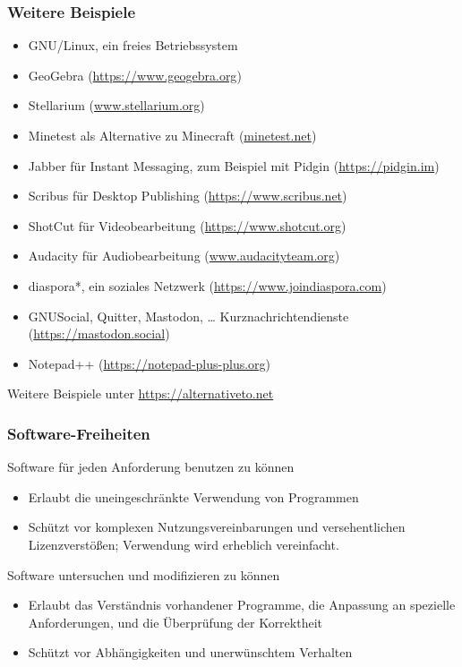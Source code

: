\documentclass{beamer}
\begin{document}
\begin{frame}
  \frametitle{Weitere Beispiele}

  \onslide<+->

  \begin{itemize}
  \item GNU/Linux, ein freies Betriebssystem %
  \item GeoGebra (\url{https://www.geogebra.org})
  \item Stellarium (\url{www.stellarium.org})
  \item Minetest als Alternative zu Minecraft (\url{minetest.net})
  \item Jabber für Instant Messaging, zum Beispiel mit Pidgin
    (\url{https://pidgin.im})
  \item Scribus für Desktop Publishing (\url{https://www.scribus.net})
  \item ShotCut für Videobearbeitung (\url{https://www.shotcut.org})
  \item Audacity für Audiobearbeitung (\url{www.audacityteam.org})
  \item diaspora*, ein soziales Netzwerk (\url{https://www.joindiaspora.com})
  \item GNUSocial, Quitter, Mastodon, \dots{} Kurznachrichtendienste
    (\url{https://mastodon.social})
  \item Notepad++ (\url{https://notepad-plus-plus.org})
  \end{itemize}

  Weitere Beispiele unter \url{https://alternativeto.net}

\end{frame}

\begin{frame}
  \frametitle{Software-Freiheiten}

  \onslide<+->
  \onslide<+->

  \begin{block}{Software für jeden Anforderung benutzen zu können}
    \begin{itemize}
    \item Erlaubt die uneingeschränkte Verwendung von Programmen
    \item Schützt vor komplexen Nutzungsvereinbarungen und versehentlichen
      Lizenzverstößen; Verwendung wird erheblich vereinfacht.
    \end{itemize}
  \end{block}

  \onslide<+->

  \begin{block}{Software untersuchen und modifizieren zu können}
    \begin{itemize}
    \item Erlaubt das Verständnis vorhandener Programme, die Anpassung an
      spezielle Anforderungen, und die Überprüfung der Korrektheit
    \item Schützt vor Abhängigkeiten und unerwünschtem Verhalten
    \end{itemize}
  \end{block}

\end{frame}
\end{document}
